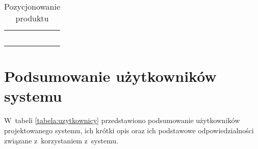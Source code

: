 \begin{minipage}{\textwidth}
    \begin{table}[H]
        \centering\caption{Pozycjonowanie produktu \source{\ownwork}\label{tabela:pozycjonowanie-produktu}}
        \begin{tabular}{|P{.2\textwidth}|p{.7\textwidth}|}

            \hline
             &
             \\
            \hline

             &
             \\
            \hline

             &
             \\
            \hline

             &
             \\
            \hline

             &
             \\
            \hline

             &
             \\
            \hline
        \end{tabular}
    \end{table}
\end{minipage}

\pagebreak
\section{Podsumowanie użytkowników systemu}\label{sec:users-summary}
\par
W~tabeli \ref{tabela:uzytkownicy} przedstawiono podsumowanie użytkowników projektowanego systemu, ich krótki opis oraz ich podstawowe odpowiedzialności związane z~korzystaniem z~systemu.

